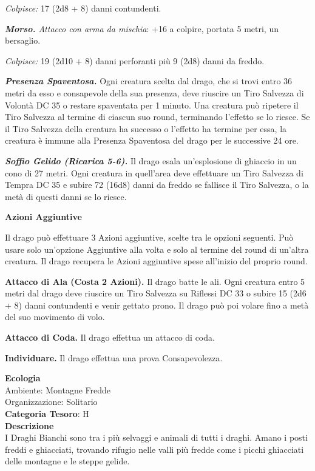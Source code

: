 \begin{multicols}{2}
{\emph{Colpisce:} 17 (2d8 + 8) danni contundenti.

\emph{\textbf{Morso.} Attacco con arma da mischia}: +16 a colpire, portata 5 metri, un bersaglio.

\emph{Colpisce:} 19 (2d10 + 8) danni perforanti più 9 (2d8) danni da freddo.

\emph{\textbf{Presenza Spaventosa.}} Ogni creatura scelta dal drago, che si trovi entro 36 metri da esso e consapevole della sua presenza, deve riuscire un Tiro Salvezza di Volontà DC 35 o restare spaventata per 1 minuto. Una creatura può ripetere il Tiro Salvezza al termine di ciascun suo round, terminando l'effetto se lo riesce. Se il Tiro Salvezza della creatura ha successo o l'effetto ha termine per essa, la creatura è immune alla Presenza Spaventosa del drago per le successive 24 ore.

\emph{\textbf{Soffio Gelido (Ricarica 5-6).}} Il drago esala un'esplosione di ghiaccio in un cono di 27 metri. Ogni creatura in quell'area deve effettuare un Tiro Salvezza di Tempra DC 35 e subire 72 (16d8) danni da freddo se fallisce il Tiro Salvezza, o la metà di questi danni se lo riesce.

\textbf{Azioni Aggiuntive}

Il drago può effettuare 3 Azioni aggiuntive, scelte tra le opzioni seguenti. Può usare solo un'opzione Aggiuntive alla volta e solo al termine del round di un'altra creatura. Il drago recupera le Azioni aggiuntive spese all'inizio del proprio round.

\textbf{Attacco di Ala (Costa 2 Azioni).} Il drago batte le ali. Ogni creatura entro 5 metri dal drago deve riuscire un Tiro Salvezza su Riflessi DC 33 o subire 15 (2d6 + 8) danni contundenti e venir gettato prono. Il drago può poi volare fino a metà del suo movimento di volo.

\textbf{Attacco di Coda.} Il drago effettua un attacco di coda.

\textbf{Individuare.} Il drago effettua una prova Consapevolezza.

\textbf{Ecologia}\\
Ambiente: Montagne Fredde\\
Organizzazione: Solitario\\
\textbf{Categoria Tesoro}: H\\
\textbf{Descrizione}\\
I Draghi Bianchi sono tra i più selvaggi e animali di tutti i draghi.
Amano i posti freddi e ghiacciati, trovando rifugio nelle valli più fredde come i picchi ghiacciati delle montagne e le steppe gelide.

}
\end{multicols}
